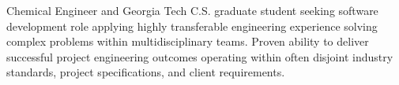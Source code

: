%
%
%
%
%
Chemical Engineer and Georgia Tech C.S. graduate student seeking software development role applying highly transferable engineering experience solving complex problems within multidisciplinary teams.
%
%
%
\statementSpace
%
%
%
%
Proven ability to deliver successful project engineering outcomes operating within often disjoint industry standards, project specifications, and client requirements. 
%
%
%
%
%
%
%
